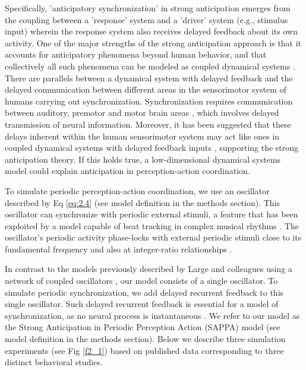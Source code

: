 \documentclass{report}
\begin{document}
Specifically, 'anticipatory synchronization' in strong anticipation emerges from the coupling between a 'response' system and a 'driver' system (e.g., stimulus input) wherein the response system also receives delayed feedback about its own activity. One of the major strengths of the strong anticipation approach is that it accounts for anticipatory phenomena beyond human behavior, and that collectively all such phenomena can be modeled as coupled dynamical systems \cite{stepp2010strong, washburn2015harmony, kelso1995dynamic}. There are parallels between a dynamical system with delayed feedback and the delayed communication between different areas in the sensorimotor system of humans carrying out synchronization. Synchronization requires communication between auditory, premotor and motor brain areas \cite{merchant2015finding, banerjee2007neural, slowinski2016effects}, which involves delayed transmission of neural information. Moreover, it has been suggested that these delays inherent within the human sensorimotor system may act like ones in coupled dynamical systems with delayed feedback inputs \cite{washburn2015harmony, banerjee2007neural, slowinski2016effects}, supporting the strong anticipation theory. If this holds true, a low-dimensional dynamical systems model could explain anticipation in perception-action coordination.

To simulate periodic perception-action coordination, we use an oscillator described by Eq \eqref{eq:2.4} (see model definition in the methods section). This oscillator can synchronize with periodic external stimuli, a feature that has been exploited by a model capable of beat tracking in complex musical rhythms \cite{large2015neural, velasco2011pulse}. The oscillator's periodic activity phase-locks with external periodic stimuli close to its fundamental frequency and also at integer-ratio relationships \cite{large2010canonical}.

In contrast to the models previously described by Large and colleagues using a network of coupled oscillators \cite{large2015neural, velasco2011pulse, large2010canonical}, our model consists of a single oscillator. To simulate periodic synchronization, we add delayed recurrent feedback to this single oscillator. Such delayed recurrent feedback is essential for a model of synchronization, as no neural process is instantaneous \cite{banerjee2007neural}. We refer to our model as the Strong Anticipation in Periodic Perception Action (SAPPA) model (see model definition in the methods section). Below we describe three simulation experiments (see Fig \ref{f2_1}) based on published data corresponding to three distinct behavioral studies.
\end{document}
